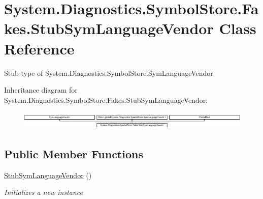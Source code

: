 \hypertarget{class_system_1_1_diagnostics_1_1_symbol_store_1_1_fakes_1_1_stub_sym_language_vendor}{\section{System.\-Diagnostics.\-Symbol\-Store.\-Fakes.\-Stub\-Sym\-Language\-Vendor Class Reference}
\label{class_system_1_1_diagnostics_1_1_symbol_store_1_1_fakes_1_1_stub_sym_language_vendor}
}


Stub type of System.\-Diagnostics.\-Symbol\-Store.\-Sym\-Language\-Vendor 


Inheritance diagram for System.\-Diagnostics.\-Symbol\-Store.\-Fakes.\-Stub\-Sym\-Language\-Vendor\-:\begin{figure}[H]
\begin{center}
\leavevmode
\includegraphics[height=0.888889cm]{class_system_1_1_diagnostics_1_1_symbol_store_1_1_fakes_1_1_stub_sym_language_vendor}
\end{center}
\end{figure}
\subsection*{Public Member Functions}
\begin{DoxyCompactItemize}
\item 
\hyperlink{class_system_1_1_diagnostics_1_1_symbol_store_1_1_fakes_1_1_stub_sym_language_vendor_af3a47290b0260a2c4eb1cae03697502c}{Stub\-Sym\-Language\-Vendor} ()
\begin{DoxyCompactList}\small\item\em Initializes a new instance\end{DoxyCompactList}\end{DoxyCompactItemize}

